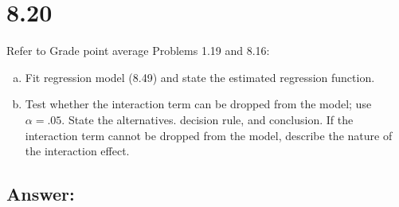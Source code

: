 \documentclass{article}
\begin{document}
\section{8.20}

Refer to Grade point average Problems 1.19 and 8.16:

\begin{enumerate}[a)]
\item{} Fit regression model (8.49) and state the estimated regression function.
\item{} Test whether the interaction term can be dropped from the model; use $\alpha{} = .05$. State the alternatives. decision rule, and conclusion. If the interaction term cannot be dropped from the model, describe the nature of the interaction effect.
\end{enumerate}

\subsection{Answer:}
\end{document}
